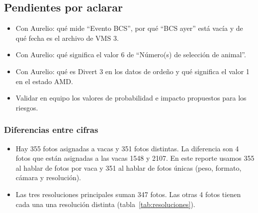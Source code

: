 \subsection{Pendientes por aclarar}

\begin{itemize}
  \item Con Aurelio: qué mide ``Evento BCS'', por qué ``BCS ayer'' está vacía y de qué fecha es el archivo de VMS 3.
  \item Con Aurelio: qué significa el valor 6 de ``Número(s) de selección de animal''.
  \item Con Aurelio: qué es Divert 3 en los datos de ordeño y qué significa el valor 1 en el estado AMD.
  \item Validar en equipo los valores de probabilidad e impacto propuestos para los riesgos.
\end{itemize}

\subsubsection*{Diferencias entre cifras}

\begin{itemize}
  \item Hay 355 fotos asignadas a vacas y 351 fotos distintas. La diferencia son 4 fotos que están asignadas a las vacas 1548 y 2107. En este reporte usamos 355 al hablar de fotos por vaca y 351 al hablar de fotos únicas (peso, formato, cámara y resolución).
  \item Las tres resoluciones principales suman 347 fotos. Las otras 4 fotos tienen cada una una resolución distinta (tabla~\ref{tab:resoluciones}).
\end{itemize}

